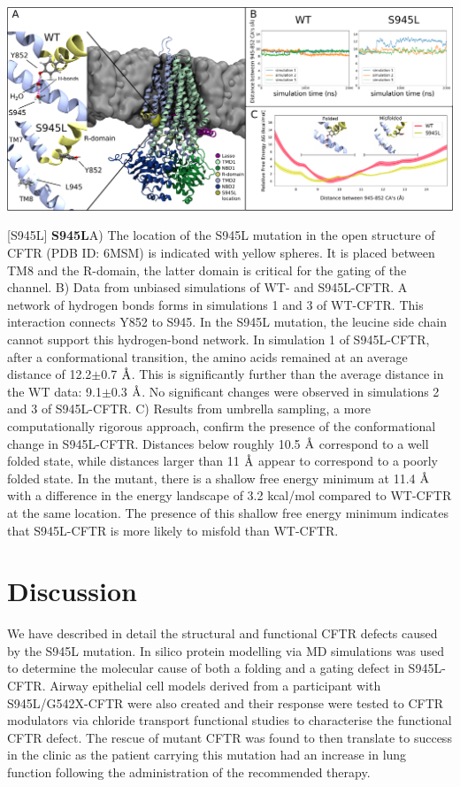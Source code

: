 \begin{center}
	\includegraphics[width=\textwidth]{figures/S945L/Figure1_MD_03082022.pdf}
\end{center}
	\captionsetup{singlelinecheck = false, justification=raggedright}
\begingroup
{}[S945L] {\textbf{S945L}}{A) The location of the S945L mutation in the open structure of CFTR (PDB ID: 6MSM) is indicated with yellow spheres. It is placed between TM8 and the R-domain, the latter domain is critical for the gating of the channel. B) Data from unbiased simulations of WT- and S945L-CFTR. A network of hydrogen bonds forms in simulations 1 and 3 of WT-CFTR. This interaction connects Y852 to S945. In the S945L mutation, the leucine side chain cannot support this hydrogen-bond network. In simulation 1 of S945L-CFTR, after a conformational transition, the amino acids remained at an average distance of 12.2$\pm$0.7 $\textup{\AA}$. This is significantly further than the average distance in the WT data: 9.1$\pm$0.3 $\textup{\AA}$. No significant changes were observed in simulations 2 and 3 of S945L-CFTR. C) Results from umbrella sampling, a more computationally rigorous approach, confirm the presence of the conformational change in S945L-CFTR. Distances below roughly 10.5 $\textup{\AA}$ correspond to a well folded state, while distances larger than 11 $\textup{\AA}$ appear to correspond to a poorly folded state. In the mutant, there is a shallow free energy minimum at 11.4 $\textup{\AA}$ with a difference in the energy landscape of 3.2 kcal/mol compared to WT-CFTR at the same location. The presence of this shallow free energy minimum indicates that S945L-CFTR is more likely to misfold than WT-CFTR. }
\label{S945L_MD_1}
\endgroup

\section{Discussion}
We have described in detail the structural and functional CFTR defects caused by the S945L mutation. In silico protein modelling via MD simulations was used to determine the molecular cause of both a folding and a gating defect in S945L-CFTR.   Airway epithelial cell models derived from a participant with S945L/G542X-CFTR were also created and their response were tested to CFTR modulators via chloride transport functional studies to characterise the functional CFTR defect. The rescue of mutant CFTR was found to then translate to success in the clinic as the patient carrying this mutation had an increase in lung function following the administration of the recommended therapy.

